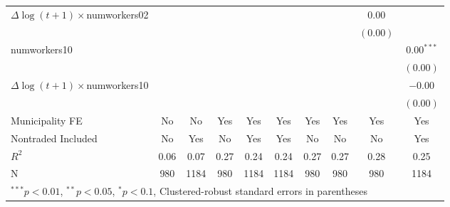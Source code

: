 \begin{tabular}{l c c c c c c c c c }
$\Delta \log(t+1) \times$numworkers02 &              &              &              &              &              &              &              & $0.00$       &              \\
                     &              &              &              &              &              &              &              & $(0.00)$     &              \\
numworkers10         &              &              &              &              &              &              &              &              & $0.00^{***}$ \\
                     &              &              &              &              &              &              &              &              & $(0.00)$     \\
$\Delta \log(t+1) \times$numworkers10 &              &              &              &              &              &              &              &              & $-0.00$      \\
                     &              &              &              &              &              &              &              &              & $(0.00)$     \\
\hline
Municipality FE     &No&No&Yes&Yes&Yes&Yes&Yes&Yes&Yes\\ 
Nontraded Included     &No&Yes&No&Yes&Yes&No&No&No&Yes\\ 
\hline
$R^2$                & 0.06         & 0.07         & 0.27         & 0.24         & 0.24         & 0.27         & 0.27         & 0.28         & 0.25         \\
N                    & 980          & 1184         & 980          & 1184         & 1184         & 980          & 980          & 980          & 1184         \\
\hline
\multicolumn{10}{l}{\scriptsize{$^{***}p<0.01$, $^{**}p<0.05$, $^*p<0.1$, Clustered-robust standard errors in parentheses}}
\end{tabular}
